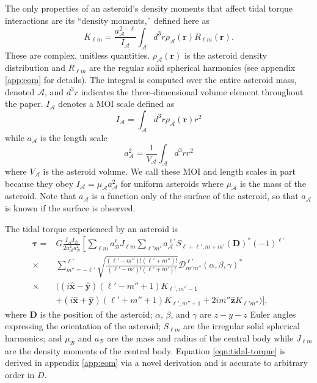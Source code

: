\documentclass[fleqn,usenatbib]{mnras}
\newcommand{\unit}[1]{\bm{\hat{#1}}}
\begin{document}
The only properties of an asteroid's density moments that affect tidal torque interactions are its ``density moments,'' defined here as
\begin{equation}
  K_{\ell m} = \frac{a_\mathcal{A}^{2-\ell}}{I_\mathcal{A}} \int_\mathcal{A} d^3 r \rho_\mathcal{A}(\bm r) R_{\ell m}(\bm r).
  \label{eqn:klm}
\end{equation}
These are complex, unitless quantities. $\rho_\mathcal{A}(\bm r)$ is the asteroid density distribution and $R_{\ell m}$ are the regular solid spherical harmonics (see appendix \ref{app:eom} for details). The integral is computed over the entire asteroid mass, denoted $\mathcal{A}$, and $d^3 r$ indicates the three-dimensional volume element throughout the paper. $I_\mathcal{A}$ denotes a MOI scale defined as 
\begin{equation}
  I_\mathcal{A} = \int_\mathcal{A} d^3 r \rho_\mathcal{A}(\bm r) r^2
  \label{eqn:ia}
\end{equation}
while $a_\mathcal{A}$ is the length scale
\begin{equation}
  a_\mathcal{A}^2 = \frac{1}{V_\mathcal{A}} \int_\mathcal{A} d^3 r r^2
  \label{eqn:aa}
\end{equation}
where $V_\mathcal{A}$ is the asteroid volume. We call these MOI and length scales in part because they obey $I_\mathcal{A} = \mu_\mathcal{A} a_\mathcal{A}^2$ for uniform asteroids where $\mu_\mathcal{A}$ is the mass of the asteroid. Note that $a_\mathcal{A}$ is a function only of the surface of the asteroid, so that $a_\mathcal{A}$ is known if the surface is observed.

The tidal torque experienced by an asteroid is 
\begin{equation}
  \begin{split}
  \bm \tau = & G\frac{I_\mathcal{A}I_\mathcal{B}}{2 a_\mathcal{A}^2a_\mathcal{B}^2}\left[\sum_{\ell m} a_\mathcal{B}^\ell J_{\ell m} \sum_{\ell' m'}a_\mathcal{A}^{\ell'}S_{\ell+\ell', m + m'} (\bm D)^* (-1)^{\ell'}\right.\\
  \times & \left.\sum_{m''=-\ell'}^{\ell'} \sqrt{\frac{(\ell'-m'')!(\ell'+m'')!}{(\ell'-m')!(\ell'+m')!}}  \mathcal{D}^{\ell'}_{m'm''}(\alpha, \beta, \gamma)^* \right. \\
  \times & \Big((i\unit x - \unit y)(\ell'-m''+1)K_{\ell',m''-1} \\
  & +(i\unit x+\unit y)(\ell'+m''+1)K_{\ell',m''+1}+2im''\unit z K_{\ell'm''}\Big) \Bigg],
  \end{split}
  \label{eqn:tidal-torque}
\end{equation}
where $\bm D$ is the position of the asteroid; $\alpha$, $\beta$, and $\gamma$ are $z-y-z$ Euler angles expressing the orientation of the asteroid; $S_{\ell m}$ are the irregular solid spherical harmonics; and $\mu_\mathcal{B}$ and $a_\mathcal{B}$ are the mass and radius of the central body while $J_{\ell m}$ are the density moments of the central body. Equation \ref{eqn:tidal-torque} is derived in appendix \ref{app:eom} via a novel derivation and is accurate to arbitrary order in $D$.
\end{document}
